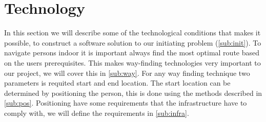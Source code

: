 
\section{Technology}

In this section we will describe some of the technological conditions that makes it possible, to construct a software solution to our initiating problem (\cref{sub:init}).  
To navigate persons indoor it is important always find the most optimal route based on the users prerequisites. This makes way-finding technologies very important to our project, we will cover this in \cref{sub:way}. For any way finding technique two parameters is requited start and end location. The start location can be determined by positioning the person, this is done using the methods described in \cref{sub:pos}.
Positioning have some requirements that the infrastructure have to comply with, we will define the requirements in \cref{sub:infra}. 



 


